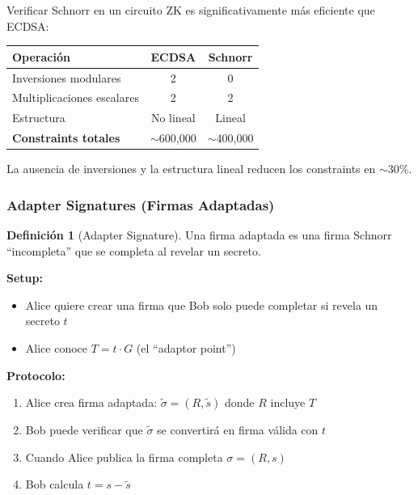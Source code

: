 \documentclass[11pt,a4paper,twoside,openright]{book}
\theoremstyle{definition}
\newtheorem{definition}{Definición}[chapter]
\theoremstyle{plain}
\theoremstyle{remark}
\begin{document}
\begin{mathnote}
Verificar Schnorr en un circuito ZK es significativamente más eficiente que ECDSA:

\begin{center}
\begin{tabular}{lcc}
\toprule
\textbf{Operación} & \textbf{ECDSA} & \textbf{Schnorr} \\
\midrule
Inversiones modulares & 2 & 0 \\
Multiplicaciones escalares & 2 & 2 \\
Estructura & No lineal & Lineal \\
\midrule
\textbf{Constraints totales} & $\sim$600,000 & $\sim$400,000 \\
\bottomrule
\end{tabular}
\end{center}

La ausencia de inversiones y la estructura lineal reducen los constraints en $\sim$30\%.
\end{mathnote}

\subsubsection{Adapter Signatures (Firmas Adaptadas)}

\begin{definition}[Adapter Signature]
Una firma adaptada es una firma Schnorr ``incompleta'' que se completa al revelar un secreto.

\textbf{Setup:}
\begin{itemize}
    \item Alice quiere crear una firma que Bob solo puede completar si revela un secreto $t$
    \item Alice conoce $T = t \cdot G$ (el ``adaptor point'')
\end{itemize}

\textbf{Protocolo:}
\begin{enumerate}
    \item Alice crea firma adaptada: $\tilde{\sigma} = (R, \tilde{s})$ donde $R$ incluye $T$
    \item Bob puede verificar que $\tilde{\sigma}$ se convertirá en firma válida con $t$
    \item Cuando Alice publica la firma completa $\sigma = (R, s)$
    \item Bob calcula $t = s - \tilde{s}$
\end{enumerate}
\end{definition}
\end{document}
